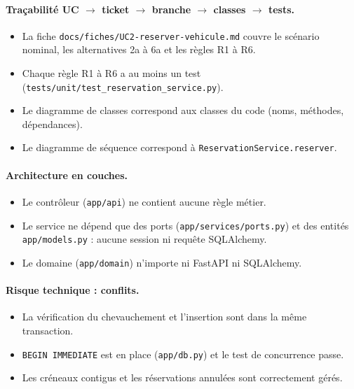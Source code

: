 \documentclass[11pt,a4paper]{article}
\begin{document}
\paragraph{Traçabilité UC $\rightarrow$ ticket $\rightarrow$ branche $\rightarrow$
classes $\rightarrow$ tests.}
\begin{itemize}[label=$\square$]
  \item La fiche \texttt{docs/fiches/UC2-reserver-vehicule.md} couvre le scénario
        nominal, les alternatives 2a à 6a et les règles R1 à R6.
  \item Chaque règle R1 à R6 a au moins un test
        (\texttt{tests/unit/test\_reservation\_service.py}).
  \item Le diagramme de classes correspond aux classes du code (noms, méthodes,
        dépendances).
  \item Le diagramme de séquence correspond à \texttt{ReservationService.reserver}.
\end{itemize}

\paragraph{Architecture en couches.}
\begin{itemize}[label=$\square$]
  \item Le contrôleur (\texttt{app/api}) ne contient aucune règle métier.
  \item Le service ne dépend que des ports (\texttt{app/services/ports.py}) et des
        entités \texttt{app/models.py} : aucune session ni requête SQLAlchemy.
  \item Le domaine (\texttt{app/domain}) n'importe ni FastAPI ni SQLAlchemy.
\end{itemize}

\paragraph{Risque technique : conflits.}
\begin{itemize}[label=$\square$]
  \item La vérification du chevauchement et l'insertion sont dans la même transaction.
  \item \texttt{BEGIN IMMEDIATE} est en place (\texttt{app/db.py}) et le test de
        concurrence passe.
  \item Les créneaux contigus et les réservations annulées sont correctement gérés.
\end{itemize}
\end{document}
